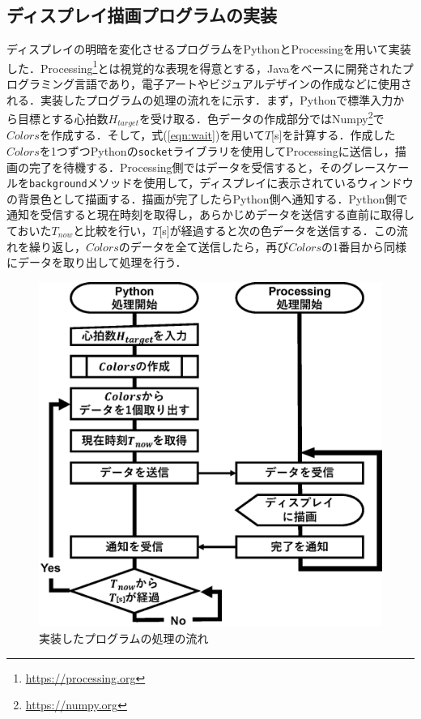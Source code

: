 \documentclass[Japanese,noauthor]{dicomopapers}
\begin{document}
\subsection{ディスプレイ描画プログラムの実装}
\label{subsec:software}
ディスプレイの明暗を変化させるプログラムをPythonとProcessingを用いて実装した．Processing\footnote{\url{https://processing.org}}とは視覚的な表現を得意とする，Javaをベースに開発されたプログラミング言語であり，電子アートやビジュアルデザインの作成などに使用される．実装したプログラムの処理の流れをに示す．まず，Pythonで標準入力から目標とする心拍数$H_{target}$を受け取る．色データの作成部分ではNumpy\footnote{\url{https://numpy.org}}で$Colors$を作成する．そして，式(\ref{eqn:wait})を用いて$T$[s]を計算する．作成した$Colors$を1つずつPythonの\texttt{socket}ライブラリを使用してProcessingに送信し，描画の完了を待機する．Processing側ではデータを受信すると，そのグレースケールを\texttt{background}メソッドを使用して，ディスプレイに表示されているウィンドウの背景色として描画する．描画が完了したらPython側へ通知する．Python側で通知を受信すると現在時刻を取得し，あらかじめデータを送信する直前に取得しておいた$T_{now}$と比較を行い，$T$[s]が経過すると次の色データを送信する．この流れを繰り返し，$Colors$のデータを全て送信したら，再び$Colors$の1番目から同様にデータを取り出して処理を行う．

\begin{figure}[!t]
  \centering
  \includegraphics[width=1\linewidth]{figures/software.eps}
  \caption{実装したプログラムの処理の流れ}
  \label{fig:software}
\end{figure}
\end{document}
